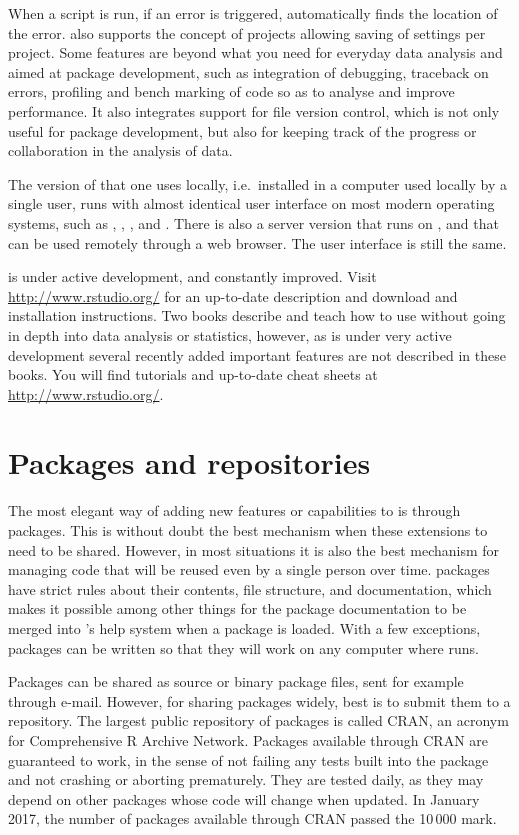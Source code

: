 \documentclass[krantz2]{krantz}\usepackage{knitr}%
\begin{document}
When a script is run, if an error is triggered, \RStudio automatically finds the location of the error. \RStudio also supports the concept of projects allowing saving of settings per project. Some features are beyond what you need for everyday data analysis and aimed at package development, such as integration of debugging, traceback on errors, profiling and bench marking of code so as to analyse and improve performance. It also integrates support for file version control, which is not only useful for package development, but also for keeping track of the progress or collaboration in the analysis of data.

The version of \RStudio that one uses locally, i.e.\ installed in a computer used locally by a single user, runs with almost identical user interface on most modern operating systems, such as , , , and . There is also a server version that runs on , and that can be used remotely through a web browser. The user interface is still the same.

\RStudio is under active development, and constantly improved. Visit \url{http://www.rstudio.org/} for an up-to-date description and download and installation instructions. Two books \autocite{vanderLoo2012,Hillebrand2015} describe and teach how to use \RStudio without going in depth into data analysis or statistics, however, as \RStudio is under very active development several recently added important features are not described in these books. You will find tutorials and up-to-date cheat sheets at \url{http://www.rstudio.org/}.

\section{Packages and repositories}
The most elegant way of adding new features or capabilities to \Rlang is through packages. This is without doubt the best mechanism when these extensions to \Rlang need to be shared. However, in most situations it is also the best mechanism for managing code that will be reused even by a single person over time. \Rlang packages have strict rules about their contents, file structure, and documentation, which makes it possible among other things for the package documentation to be merged into \Rpgrm's help system when a package is loaded. With a few exceptions, packages can be written so that they will work on any computer where \Rpgrm runs.

Packages can be shared as source or binary package files, sent for example through e-mail. However, for sharing packages widely, best is to submit them to a repository. The largest public repository of \Rpgrm packages is called CRAN, an acronym for Comprehensive R Archive Network. Packages available through CRAN are guaranteed to work, in the sense of not failing any tests built into the package and not crashing or aborting prematurely. They are tested daily, as they may depend on other packages whose code will change when updated. In January 2017, the number of packages available through CRAN passed the 10\,000 mark.
\end{document}
